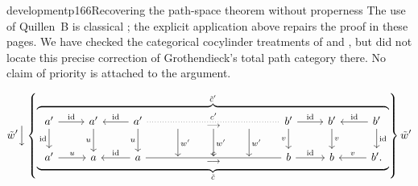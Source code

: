 \begin{dcomment}{development}{p166}{Recovering the path-space theorem without properness}
The use of Quillen~B is classical \citep[\S1]{Quillen1973}; the explicit application above repairs the proof in these pages. We have checked the categorical cocylinder treatments of \citet{Evrard1975} and \citet{Shoikhet2016}, but did not locate this precise correction of Grothendieck's total path category there. No claim of priority is attached to the argument.
\end{dcomment}



\[
\tilde{w}'\Big\downarrow
\left\{
\overbrace{\underbrace{
\begin{tikzcd}[ampersand replacement=\&]
a' \arrow[r, "\mathrm{id}"] \arrow[d, "\mathrm{id}"'] \& a' \arrow[d, "u"'] \& a' \arrow[l, "\mathrm{id}"'] \arrow[d, "u"'] \arrow[rrrr, dotted, no head, "c'", "\longrightarrow"'] \& {} \arrow[d, "w'"] \& {} \arrow[d, "w'"] \& {} \arrow[d, "w'"] \& b' \arrow[r, "\mathrm{id}"] \arrow[d, "v"'] \& b' \arrow[d, "v"] \& b' \arrow[l, "\mathrm{id}"'] \arrow[d, "\mathrm{id}"] \\
a' \arrow[r, "u"] \& a \& a \arrow[l, "\mathrm{id}"'] \arrow[rrrr, no head, "c", "\longrightarrow"'] \& {} \& {} \& {} \& b \arrow[r, "\mathrm{id}"] \& b \& b'. \arrow[l, "v"']
\end{tikzcd}
}_{\tilde{c}}}^{\tilde{c}'}
\right\}
\tilde{w}'
\]


